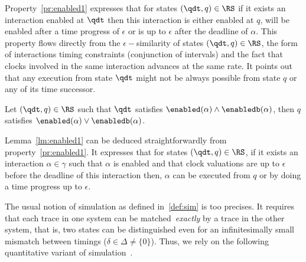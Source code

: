 Property~\ref{pr:enabled1} expresses that for states $(\qdt,q)\in\RS$ if it exists
an interaction enabled at $\qdt$ then this interaction is either enabled at $q$, 
will be enabled after a time progress of $\epsilon$ or is up to $\epsilon$ after 
the deadline of $\alpha$. This property flows directly from the $\epsilon-$similarity
of states $(\qdt,q)\in\RS$, the form of interactions timing constraints (conjunction of intervals)
and the fact that clocks involved in the same interaction advances at the same rate. 
It points out that any execution from
state $\qdt$ might not be always possible from state $q$ or any of its time successor.

\begin{lemma}\label{lm:enabled1}
  Let $(\qdt,q)\in\RS$ such that $\qdt$ satisfies $\enabled(\alpha)\wedge\enabledb(\alpha)$, then
  $q$ satisfies $\enabled(\alpha)\vee\enabledb(\alpha)$.
\end{lemma}
Lemma~\ref{lm:enabled1} can be deduced straightforwardly from property~\ref{pr:enabled1}.
It expresses that for states $(\qdt,q)\in\RS$, if it exists an interaction $\alpha\in\gamma$
such that $\alpha$ is enabled and that clock valuations are up to $\epsilon$ before the deadline
of this interaction then, $\alpha$ can be executed from $q$ or by doing a time progress
up to $\epsilon$.

The usual notion of simulation as defined in~\ref{def:sim} is too precises. 
It requires that each trace in one system
can be matched~\emph{exactly} by a trace in the other system, that is, 
two states can be distinguished even for an infinitesimally
small mismatch between timings ($\delta\in\Delta\neq\{0\}$). 
Thus, we rely on the following quantitative variant of simulation~\cite{drift:esim}. 

